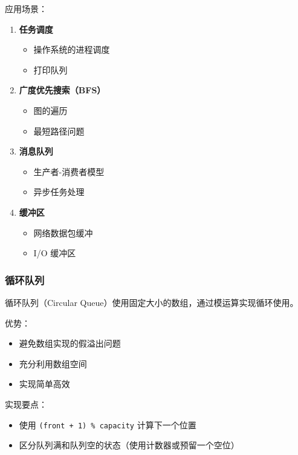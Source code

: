 应用场景：
\begin{enumerate}
  \item \textbf{任务调度}
    \begin{itemize}
      \item 操作系统的进程调度
      \item 打印队列
    \end{itemize}

  \item \textbf{广度优先搜索（BFS）}
    \begin{itemize}
      \item 图的遍历
      \item 最短路径问题
    \end{itemize}

  \item \textbf{消息队列}
    \begin{itemize}
      \item 生产者-消费者模型
      \item 异步任务处理
    \end{itemize}

  \item \textbf{缓冲区}
    \begin{itemize}
      \item 网络数据包缓冲
      \item I/O 缓冲区
    \end{itemize}
\end{enumerate}

\subsubsection{循环队列}

循环队列（Circular Queue）使用固定大小的数组，通过模运算实现循环使用。

优势：
\begin{itemize}
  \item 避免数组实现的假溢出问题
  \item 充分利用数组空间
  \item 实现简单高效
\end{itemize}

实现要点：
\begin{itemize}
  \item 使用 \texttt{(front + 1) \% capacity} 计算下一个位置
  \item 区分队列满和队列空的状态（使用计数器或预留一个空位）
\end{itemize}

